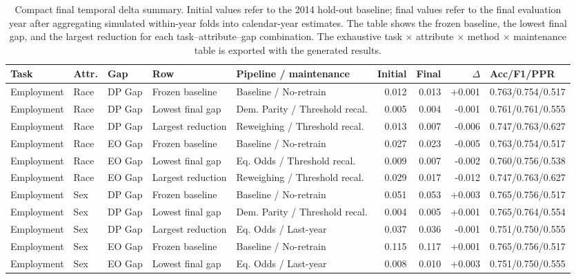 \begin{table}[!t]
\centering
\tiny
\setlength{\tabcolsep}{2pt}
\renewcommand{\arraystretch}{1.05}
\caption{Compact final temporal delta summary. Initial values refer to the 2014 hold-out baseline; final values refer to the final evaluation year after aggregating simulated within-year folds into calendar-year estimates. The table shows the frozen baseline, the lowest final gap, and the largest reduction for each task--attribute--gap combination. The exhaustive task $\times$ attribute $\times$ method $\times$ maintenance table is exported with the generated results.}
\label{tab:final_delta_summary}
\begin{tabular}{lll l p{} rrr l}
\toprule
Task & Attr. & Gap & Row & Pipeline / maintenance & Initial & Final & $\Delta$ & Acc/F1/PPR \\
\midrule
Employment & Race & DP Gap & Frozen baseline & Baseline / No-retrain & 0.012 & 0.013 & +0.001 & 0.763/0.754/0.517 \\
Employment & Race & DP Gap & Lowest final gap & Dem. Parity / Threshold recal. & 0.005 & 0.004 & -0.001 & 0.761/0.761/0.555 \\
Employment & Race & DP Gap & Largest reduction & Reweighing / Threshold recal. & 0.013 & 0.007 & -0.006 & 0.747/0.763/0.627 \\
Employment & Race & EO Gap & Frozen baseline & Baseline / No-retrain & 0.027 & 0.023 & -0.005 & 0.763/0.754/0.517 \\
Employment & Race & EO Gap & Lowest final gap & Eq. Odds / Threshold recal. & 0.009 & 0.007 & -0.002 & 0.760/0.756/0.538 \\
Employment & Race & EO Gap & Largest reduction & Reweighing / Threshold recal. & 0.029 & 0.017 & -0.012 & 0.747/0.763/0.627 \\
Employment & Sex & DP Gap & Frozen baseline & Baseline / No-retrain & 0.051 & 0.053 & +0.003 & 0.765/0.756/0.517 \\
Employment & Sex & DP Gap & Lowest final gap & Dem. Parity / Threshold recal. & 0.004 & 0.005 & +0.001 & 0.765/0.764/0.554 \\
Employment & Sex & DP Gap & Largest reduction & Eq. Odds / Last-year & 0.037 & 0.036 & -0.001 & 0.751/0.750/0.555 \\
Employment & Sex & EO Gap & Frozen baseline & Baseline / No-retrain & 0.115 & 0.117 & +0.001 & 0.765/0.756/0.517 \\
Employment & Sex & EO Gap & Lowest final gap & Eq. Odds / Last-year & 0.008 & 0.010 & +0.003 & 0.751/0.750/0.555 \\

\end{tabular}
\end{table}
